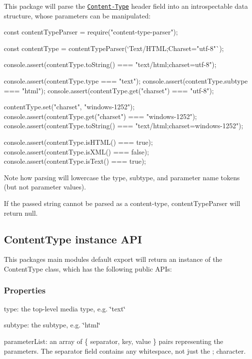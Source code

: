 This package will parse the \href{https://tools.ietf.org/html/rfc7231#section-3.1.1.1}{\tt {\ttfamily Content-\/\+Type}} header field into an introspectable data structure, whose parameters can be manipulated\+:


\begin{DoxyCode}
const contentTypeParser = require("content-type-parser");

const contentType = contentTypeParser(`Text/HTML;Charset="utf-8"`);

console.assert(contentType.toString() === "text/html;charset=utf-8");

console.assert(contentType.type === "text");
console.assert(contentType.subtype === "html");
console.assert(contentType.get("charset") === "utf-8");

contentType.set("charset", "windows-1252");
console.assert(contentType.get("charset") === "windows-1252");
console.assert(contentType.toString() === "text/html;charset=windows-1252");

console.assert(contentType.isHTML() === true);
console.assert(contentType.isXML() === false);
console.assert(contentType.isText() === true);
\end{DoxyCode}


Note how parsing will lowercase the type, subtype, and parameter name tokens (but not parameter values).

If the passed string cannot be parsed as a content-\/type, {\ttfamily content\+Type\+Parser} will return {\ttfamily null}.

\subsection*{{\ttfamily Content\+Type} instance A\+PI}

This package\textquotesingle{}s main module\textquotesingle{}s default export will return an instance of the {\ttfamily Content\+Type} class, which has the following public A\+P\+Is\+:

\subsubsection*{Properties}


\begin{DoxyItemize}
\item {\ttfamily type}\+: the top-\/level media type, e.\+g. {\ttfamily \char`\"{}text\char`\"{}}
\item {\ttfamily subtype}\+: the subtype, e.\+g. {\ttfamily \char`\"{}html\char`\"{}}
\item {\ttfamily parameter\+List}\+: an array of {\ttfamily \{ separator, key, value \}} pairs representing the parameters. The {\ttfamily separator} field contains any whitespace, not just the {\ttfamily ;} character.
\end{DoxyItemize}

